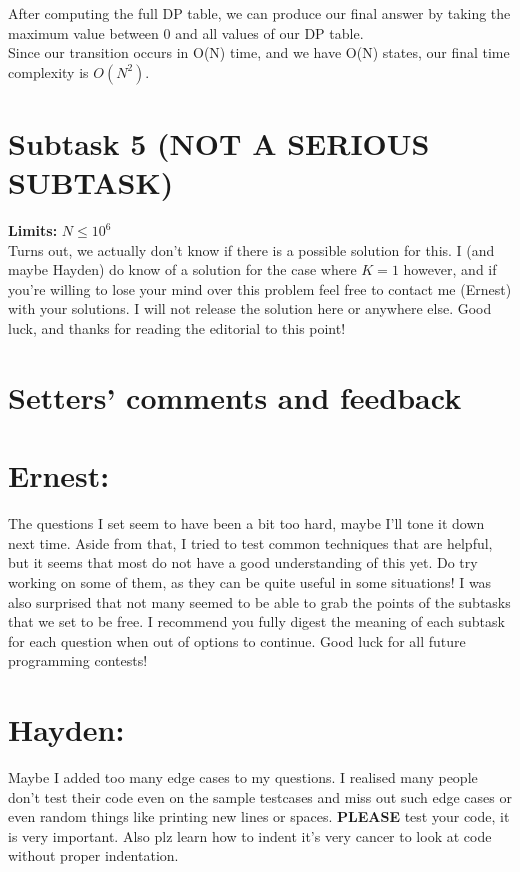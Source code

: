 \documentclass{report}
\begin{document}
After computing the full DP table, we can produce our final answer by taking the maximum value between 0 and all values of our DP table. \\

Since our transition occurs in O(N) time, and we have O(N) states, our final time complexity is $O(N^2)$.

\section*{Subtask 5 (NOT A SERIOUS SUBTASK)}
\textbf{Limits: } $N \leq 10^6$\\
Turns out, we actually don't know if there is a possible solution for this. I (and maybe Hayden) do know of a solution for the case where $K=1$ however, and if you're willing to lose your mind over this problem feel free to contact me (Ernest) with your solutions. I will not release the solution here or anywhere else. Good luck, and thanks for reading the editorial to this point!

\pagebreak
\hfill \break \hfill \break

\section*{Setters' comments and feedback}
\section*{Ernest:}
The questions I set seem to have been a bit too hard, maybe I'll tone it down next time. Aside from that, I tried to test common techniques that are helpful, but it seems that most do not have a good understanding of this yet. Do try working on some of them, as they can be quite useful in some situations! I was also surprised that not many seemed to be able to grab the points of the subtasks that we set to be free. I recommend you fully digest the meaning of each subtask for each question when out of options to continue. Good luck for all future programming contests!

\section*{Hayden:}
Maybe I added too many edge cases to my questions. I realised many people don't test their code even on the sample testcases and miss out such edge cases or even random things like printing new lines or spaces. \textbf{PLEASE} test your code, it is very important. Also plz learn how to indent it's very cancer to look at code without proper indentation.
\end{document}
